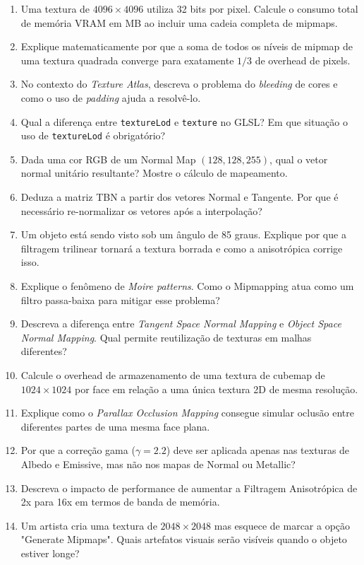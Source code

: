 \begin{enumerate}
    \item Uma textura de $4096 \times 4096$ utiliza 32 bits por pixel. Calcule o consumo total de memória VRAM em MB ao incluir uma cadeia completa de mipmaps.
    \item Explique matematicamente por que a soma de todos os níveis de mipmap de uma textura quadrada converge para exatamente $1/3$ de overhead de pixels.
    \item No contexto do \textit{Texture Atlas}, descreva o problema do \textit{bleeding} de cores e como o uso de \textit{padding} ajuda a resolvê-lo.
    \item Qual a diferença entre \texttt{textureLod} e \texttt{texture} no GLSL? Em que situação o uso de \texttt{textureLod} é obrigatório?
    \item Dada uma cor RGB de um Normal Map $(128, 128, 255)$, qual o vetor normal unitário resultante? Mostre o cálculo de mapeamento.
    \item Deduza a matriz TBN a partir dos vetores Normal e Tangente. Por que é necessário re-normalizar os vetores após a interpolação?
    \item Um objeto está sendo visto sob um ângulo de 85 graus. Explique por que a filtragem trilinear tornará a textura borrada e como a anisotrópica corrige isso.
    \item Explique o fenômeno de \textit{Moire patterns}. Como o Mipmapping atua como um filtro passa-baixa para mitigar esse problema?
    \item Descreva a diferença entre \textit{Tangent Space Normal Mapping} e \textit{Object Space Normal Mapping}. Qual permite reutilização de texturas em malhas diferentes?
    \item Calcule o overhead de armazenamento de uma textura de cubemap de $1024 \times 1024$ por face em relação a uma única textura 2D de mesma resolução.
    \item Explique como o \textit{Parallax Occlusion Mapping} consegue simular oclusão entre diferentes partes de uma mesma face plana.
    \item Por que a correção gama ($\gamma = 2.2$) deve ser aplicada apenas nas texturas de Albedo e Emissive, mas não nos mapas de Normal ou Metallic?
    \item Descreva o impacto de performance de aumentar a Filtragem Anisotrópica de 2x para 16x em termos de banda de memória.
    \item Um artista cria uma textura de $2048 \times 2048$ mas esquece de marcar a opção "Generate Mipmaps". Quais artefatos visuais serão visíveis quando o objeto estiver longe?

\end{enumerate}
